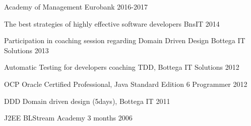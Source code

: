 
\begin{cvhonors}


  \cvhonor
    {Academy of Management} %
    {Eurobank} %
    {} %
    {2016-2017} %


  \cvhonor
    {The best strategies of highly effective software developers} %
    {BnsIT} %
    {} %
    {2014} %

  \cvhonor
    {Participation in coaching session regarding Domain Driven Design} %
    {Bottega IT Solutions} %
    {} %
    {2013} %

  \cvhonor
    {Automatic Testing for developers} %
    {coaching TDD, Bottega IT Solutions} %
    {} %
    {2012} %

  \cvhonor
    {OCP} %
    {Oracle Certified Professional, Java Standard Edition 6 Programmer} %
    {} %
    {2012} %

  \cvhonor
    {DDD} %
    {Domain driven design (5days), Bottega IT} %
    {} %
    {2011} %

  \cvhonor
    {J2EE } %
    {BLStream Academy 3 months} %
    {} %
    {2006} %



\end{cvhonors}


